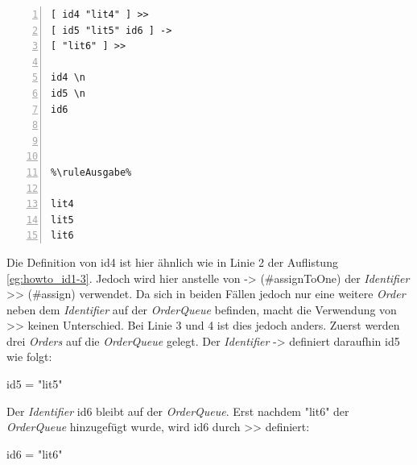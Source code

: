 \begin{minipage}{\linewidth}
\begin{multicols}{2}
\begin{lstlisting}[language=QHS, caption=Beispiel zu {\selectListingFont \#assignToOne}, numbers=left, stepnumber=1]
%\ruleEingabe%
[ id4 "lit4" ] >>
[ id5 "lit5" id6 ] ->
[ "lit6" ] >>

id4 \n
id5 \n
id6



%\ruleAusgabe%

lit4
lit5
lit6
\end{lstlisting}
\columnbreak
Die Definition von {\selectListingFont id4} ist hier ähnlich wie in Linie 2 der Auflistung \ref{eg:howto_id1-3}.
Jedoch wird hier anstelle von {\selectListingFont ->} ({\selectListingFont \#assignToOne}) der \textit{Identifier} {\selectListingFont >>} ({\selectListingFont \#assign}) verwendet.
Da sich in beiden Fällen jedoch nur eine weitere \textit{Order} neben dem \textit{Identifier} auf der \textit{OrderQueue} befinden, macht die Verwendung von {\selectListingFont >>} keinen Unterschied.
Bei Linie 3 und 4 ist dies jedoch anders. Zuerst werden drei \textit{Orders} auf die \textit{OrderQueue} gelegt. Der \textit{Identifier} {\selectListingFont ->} definiert daraufhin {\selectListingFont id5} wie folgt: \break
\centerline{\selectListingFont id5 = "lit5"{}}
Der \textit{Identifier} {\selectListingFont id6} bleibt auf der \textit{OrderQueue}.
Erst nachdem {\selectListingFont "lit6"{}} der \textit{OrderQueue} hinzugefügt wurde, wird {\selectListingFont id6} durch {\selectListingFont >>} definiert: \break
\centerline{\selectListingFont id6 = "lit6"{}}
\end{multicols}
\end{minipage}
\vspace{\baselineskip}

